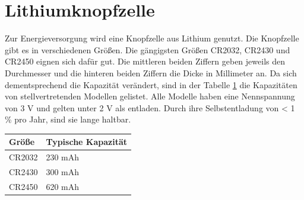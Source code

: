 \section{Lithiumknopfzelle}
Zur Energieversorgung wird eine Knopfzelle aus Lithium genutzt.
Die Knopfzelle gibt es in verschiedenen Größen.
Die gängigsten Größen CR2032, CR2430 und CR2450 eignen sich dafür gut.
Die mittleren beiden Ziffern geben jeweils den Durchmesser und die hinteren beiden Ziffern die Dicke in Millimeter an.
Da sich dementsprechend die Kapazität verändert, sind in der Tabelle \ref{tab:knopfzellen} die Kapazitäten von stellvertretenden Modellen gelistet.
Alle Modelle haben eine Nennspannung von 3 V und gelten unter 2 V als entladen.
Durch ihre Selbstentladung von < 1 \% pro Jahr, sind sie lange haltbar. \cite{datasheet_ds6450}
\begin{table}[hbtp]
	\label{tab:knopfzellen}
	\centering
	\begin{tabular}{l|l}
		Größe & Typische Kapazität\\
		\hline
		CR2032 & 230 mAh \cite{datasheet_ds6032}\\
		CR2430 & 300 mAh \cite{datasheet_ds6430}\\
		CR2450 & 620 mAh \cite{datasheet_ds6450}\\
	\end{tabular}
\end{table}

